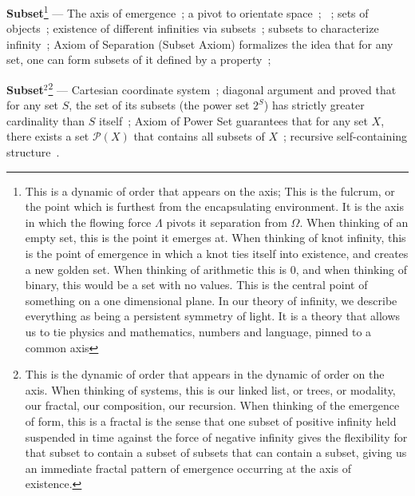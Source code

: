 \documentclass[11pt]{article}
\begin{document}
\newpage      

\textbf{Subset}\label{def:subset}\footnote{This is a dynamic of order that appears on the axis; This is the fulcrum, or the point which is furthest from the encapsulating environment. It is the axis in which the flowing force \(\Lambda\) pivots it separation from \(\Omega\). When thinking of an empty set, this is the point it emerges at. When thinking of knot infinity, this is the point of emergence in which a knot ties itself into existence, and creates a new golden set. When thinking of arithmetic this is 0, and when thinking of binary, this would be a set with no values. This is the central point of something on a one dimensional plane. In our theory of infinity, we describe everything as being a persistent symmetry of light. It is a theory that allows us to tie physics and mathematics, numbers and language, pinned to a common axis} --- The axis of emergence~\cite{Apollonius200BC}; a pivot to orientate space~\cite{Copernicus1543}; ~\cite{Descartes1637}; sets of objects~\cite{Boole1854}; existence of different infinities via subsets~\cite{Cantor1874}; subsets to characterize infinity~\cite{Dedekind1888}; Axiom of Separation (Subset Axiom) formalizes the idea that for any set, one can form subsets of it defined by a property~\cite{Zermelo1908}; 
\newpage    

\textbf{Subset\(^2\)}\label{def:subset2}\footnote{This is the dynamic of order that appears in the dynamic of order on the axis. When thinking of systems, this is our linked list, or trees, or modality, our fractal, our composition, our recursion. When thinking of the emergence of form, this is a fractal is the sense that one subset of positive infinity held suspended in time against the force of negative infinity gives the flexibility for that subset to contain a subset of subsets that can contain a subset, giving us an immediate fractal pattern of emergence occurring at the axis of existence.} --- Cartesian coordinate system~\cite{Descartes1637}; diagonal argument and proved that for any set $S$, the set of its subsets (the power set $2^S$) has strictly greater cardinality than $S$ itself~\cite{Cantor1891}; Axiom of Power Set guarantees that for any set $X$, there exists a set $\mathcal{P}(X)$ that contains all subsets of $X$~\cite{Zermelo1908};  recursive self-containing structure~\cite{Mandelbrot1982}.
\newpage
\end{document}
